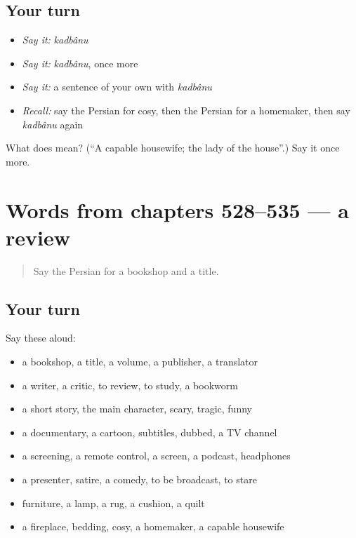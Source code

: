 \subsection*{Your turn}
\begin{itemize}
\raggedright
  \item \emph{Say it:} \emph{kadbânu}
  \item \emph{Say it:} \emph{kadbânu}, once more
  \item \emph{Say it:} a sentence of your own with \emph{kadbânu}
  \item \emph{Recall:} say the Persian for cosy, then the Persian for a homemaker, then say \emph{kadbânu} again
\end{itemize}

\begin{tcolorbox}[breakable,colback=teal!4,colframe=teal!35!black,title={Before you move on}]
What does  mean? (\textquotedblleft{}A capable housewife; the lady of the house\textquotedblright{}.) Say it once more.
\end{tcolorbox}
\section[(dialogue)]{Words from chapters 528–535 — a review}

\label{lesson:FA-R535-review-528-535}



\begin{quote}
Say the Persian for a bookshop and a title.
\end{quote}

\subsection*{Your turn}
Say these aloud:

\begin{itemize}
\raggedright
  \item a bookshop, a title, a volume, a publisher, a translator
  \item a writer, a critic, to review, to study, a bookworm
  \item a short story, the main character, scary, tragic, funny
  \item a documentary, a cartoon, subtitles, dubbed, a TV channel
  \item a screening, a remote control, a screen, a podcast, headphones
  \item a presenter, satire, a comedy, to be broadcast, to stare
  \item furniture, a lamp, a rug, a cushion, a quilt
  \item a fireplace, bedding, cosy, a homemaker, a capable housewife
\end{itemize}

